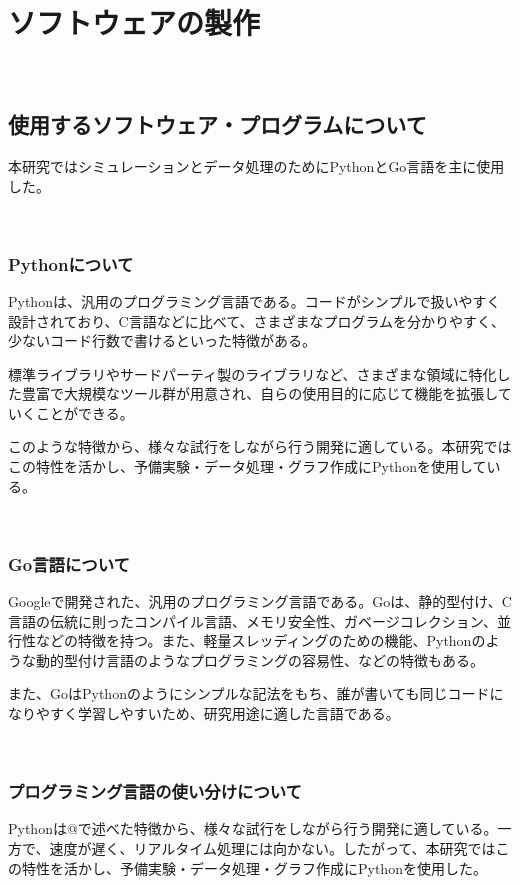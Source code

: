 \chapter{ソフトウェアの製作}\label{software}

\
\section{使用するソフトウェア・プログラムについて}\label{about-program}

本研究ではシミュレーションとデータ処理のためにPythonとGo言語を主に使用した。

\
\subsection{Pythonについて}\label{about-python}

Pythonは、汎用のプログラミング言語である。コードがシンプルで扱いやすく設計されており、C言語などに比べて、さまざまなプログラムを分かりやすく、少ないコード行数で書けるといった特徴がある。

標準ライブラリやサードパーティ製のライブラリなど、さまざまな領域に特化した豊富で大規模なツール群が用意され、自らの使用目的に応じて機能を拡張していくことができる。

このような特徴から、様々な試行をしながら行う開発に適している。本研究ではこの特性を活かし、予備実験・データ処理・グラフ作成にPythonを使用している。

\
\subsection{Go言語について}\label{about-go}

Googleで開発された、汎用のプログラミング言語である。Goは、静的型付け、C言語の伝統に則ったコンパイル言語、メモリ安全性、ガベージコレクション、並行性などの特徴を持つ。また、軽量スレッディングのための機能、Pythonのような動的型付け言語のようなプログラミングの容易性、などの特徴もある。

また、GoはPythonのようにシンプルな記法をもち、誰が書いても同じコードになりやすく学習しやすいため、研究用途に適した言語である。

\
\subsection{プログラミング言語の使い分けについて}\label{about-proper-use}

Pythonは@で述べた特徴から、様々な試行をしながら行う開発に適している。一方で、速度が遅く、リアルタイム処理には向かない。したがって、本研究ではこの特性を活かし、予備実験・データ処理・グラフ作成にPythonを使用した。

